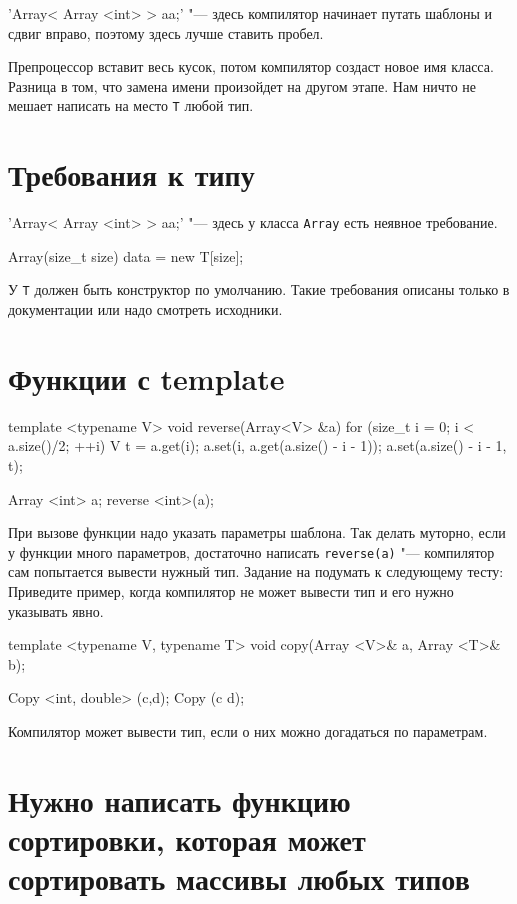 \cpp'Array< Array <int> > aa;' "--- здесь компилятор начинает путать шаблоны и сдвиг вправо, поэтому здесь лучше ставить пробел. 

Препроцессор вставит весь кусок, потом компилятор создаст новое имя класса. Разница в том, что замена имени произойдет на другом этапе. 
Нам ничто не мешает написать на место \verb'T' любой тип. 

\section{Требования к типу}

\cpp'Array< Array <int> > aa;' "--- здесь у класса \verb'Array' есть неявное требование.
\begin{cppcode}
Array(size_t size) {
    data = new T[size];
} 
\end{cppcode}
У \verb'T' должен быть конструктор по умолчанию.
Такие требования описаны только в документации или надо смотреть исходники.

\section{Функции с template}

\begin{cppcode}
template <typename V>
void reverse(Array<V> &a) {
    for (size_t i = 0; i < a.size()/2; ++i) {
        V t = a.get(i);
        a.set(i, a.get(a.size() - i - 1));
        a.set(a.size() - i - 1, t);
    }
} 

Array <int> a;
reverse <int>(a);
\end{cppcode}

При вызове функции надо указать параметры шаблона.
Так делать муторно, если у функции много параметров, достаточно написать \verb'reverse(a)' "--- компилятор сам попытается вывести нужный тип. 
Задание на подумать к следующему тесту: Приведите пример, когда компилятор не может вывести тип и его нужно указывать явно.

\begin{cppcode}
template <typename V, typename T>
void copy(Array <V>& a, Array <T>& b);

Copy <int, double> (c,d);
Copy (c d);
\end{cppcode}
Компилятор может вывести тип, если о них можно догадаться по параметрам. 

\section{Нужно написать функцию сортировки, которая может сортировать массивы любых типов}

